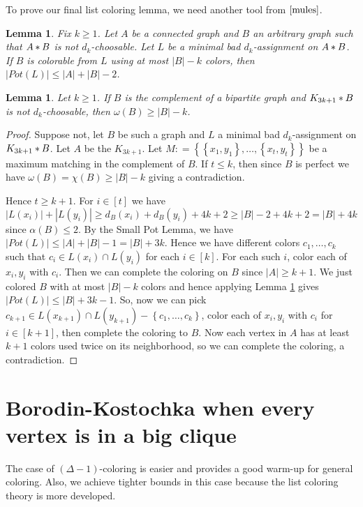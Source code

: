\documentclass[12pt]{article}
\theoremstyle{plain}
\newtheorem{lem}[thm]{Lemma}
\theoremstyle{definition}
\theoremstyle{remark}
\newcommand{\set}[1]{\left\{ #1 \right\}}
\newcommand{\card}[1]{\left|#1\right|}
\newcommand{\irange}[1]{\left[#1\right]}
\newcommand{\join}[2]{#1 \mbox{\hspace{2 pt}$\ast$\hspace{2 pt}} #2}
\newcommand{\DefinedAs}{\mathrel{\mathop:}=}
\begin{document}
To prove our final list coloring lemma, we need another tool from $\cite{mules}$.

\begin{lem}\label{ConnectedPot}
Fix $k \geq 1$. Let $A$ be a connected graph and $B$ an arbitrary graph such that $\join{A}{B}$ is not $d_k$-choosable.  Let $L$ be a minimal bad $d_k$-assignment on $\join{A}{B}$.  If $B$ is colorable
from $L$ using at most $\card{B} - k$ colors, then $\card{Pot(L)} \leq \card{A} + \card{B} - 2$.
\end{lem}

\begin{lem}\label{TwoCliques}
Let $k \geq 1$.  If $B$ is the complement of a bipartite graph and $\join{K_{3k+1}}{B}$ is not $d_k$-choosable, then $\omega(B) \geq \card{B} - k$.
\end{lem}
\begin{proof}
Suppose not, let $B$ be such a graph and $L$ a minimal bad $d_k$-assignment on $\join{K_{3k+1}}{B}$. Let $A$ be the $K_{3k+1}$. Let $M \DefinedAs \set{\set{x_1, y_1}, \ldots, \set{x_t, y_t}}$ be a maximum matching in the complement of $B$.  If $t \leq k$, then since $B$ is perfect we have $\omega(B) = \chi(B) \geq \card{B} - k$ giving a contradiction.

Hence $t \geq k+1$.  For $i \in \irange{t}$ we have $\card{L(x_i)} + \card{L(y_i)} \geq d_B(x_i) + d_B(y_i) + 4k+2 \geq \card{B} - 2 + 4k + 2 = \card{B} + 4k$ since $\alpha(B) \leq 2$.  By the Small Pot Lemma, we have $\card{Pot(L)} \leq \card{A} + \card{B} - 1 = \card{B} + 3k$.  Hence we have different colors $c_1, \ldots, c_k$ such that $c_i \in L(x_i) \cap L(y_i)$ for each $i \in \irange{k}$. For each such $i$, color each of $x_i, y_i$ with $c_i$.  Then we can complete the coloring on $B$ since $\card{A} \geq k+1$.  We just colored $B$ with at most $\card{B} - k$ colors and hence applying Lemma \ref{ConnectedPot} gives $\card{Pot(L)} \leq \card{B} + 3k - 1$.  So, now we can pick $c_{k+1} \in L(x_{k+1}) \cap L(y_{k+1}) - \set{c_1, \ldots, c_k}$, color each of $x_i, y_i$ with $c_i$ for $i \in \irange{k+1}$, then complete the coloring to $B$.  Now each vertex in $A$ has at least $k+1$ colors used twice on its neighborhood, so we can complete the coloring, a contradiction.
\end{proof}


\section{Borodin-Kostochka when every vertex is in a big clique}
The case of $(\Delta-1)$-coloring is easier and provides a good warm-up for general coloring.  Also, we achieve tighter bounds in this case because the list coloring theory is more developed.
\end{document}
